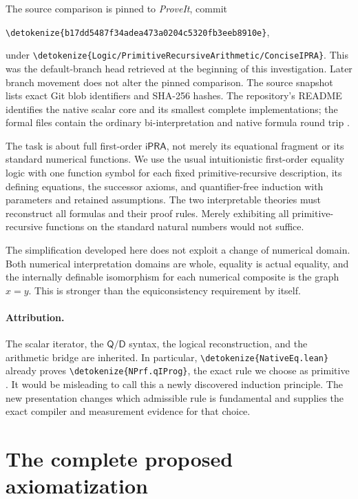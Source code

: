 \documentclass[11pt,letterpaper]{article}
\theoremstyle{definition}\newtheorem{definition}[theorem]{Definition}
\theoremstyle{remark}\newtheorem{remark}[theorem]{Remark}
\newcommand{\ipra}{\ensuremath{\mathsf{iPRA}}}
\newcommand{\D}{\mathsf D}
\newcommand{\Q}{\mathsf Q}
\newcommand{\file}[1]{\expandafter\nolinkurl\expandafter{\detokenize{#1}}}
\begin{document}
The source comparison is pinned to \emph{ProveIt}, commit
\begin{center}\small
\file{b17dd5487f34adea473a0204c5320fb3eeb8910e},
\end{center}
under \file{Logic/PrimitiveRecursiveArithmetic/ConciseIPRA}.
This was the default-branch head retrieved at the beginning of this
investigation. Later branch movement does not alter the pinned comparison.
The source snapshot lists exact Git blob identifiers and SHA-256 hashes.
The repository's README identifies the native scalar core and its
smallest complete implementations; the formal files contain the ordinary
bi-interpretation and native formula round trip \cite{repo,bi,nativecomp}.

The task is about full first-order \ipra, not merely its equational
fragment or its standard numerical functions. We use the usual
intuitionistic first-order equality logic with one function symbol for
each fixed primitive-recursive description, its defining equations, the
successor axioms, and quantifier-free induction with parameters and
retained assumptions. The two interpretable theories must reconstruct
all formulas and their proof rules. Merely exhibiting all primitive-recursive
functions on the standard natural numbers would not suffice.

The simplification developed here does not exploit a change of numerical
domain. Both numerical interpretation domains are whole, equality is
actual equality, and the internally definable isomorphism for each
numerical composite is the graph $x=y$. This is stronger than the
equiconsistency requirement by itself.

\paragraph{Attribution.}
The scalar iterator, the $\Q/\D$ syntax, the logical reconstruction, and
the arithmetic bridge are inherited. In particular,
\file{NativeEq.lean} already proves \file{NPrf.qIProg}, the exact rule
we choose as primitive \cite{nativeeq}. It would be misleading to call
this a newly discovered induction principle. The new presentation changes
which admissible rule is fundamental and supplies the exact compiler and
measurement evidence for that choice.

\section{The complete proposed axiomatization}
\label{sec:new-calculus}
\end{document}
